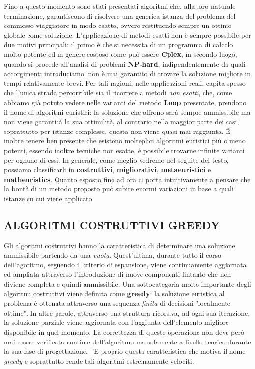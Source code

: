 \documentclass[11pt]{article}
\begin{document}
Fino a questo momento sono stati presentati algoritmi che, alla loro naturale terminazione, garantiscono di risolvere una generica istanza del problema del commesso viaggiatore in modo esatto, ovvero restituendo sempre un ottimo globale come soluzione.
L'applicazione di metodi esatti non è sempre possibile per due motivi principali: il primo è che si necessita di un programma di calcolo molto potente ed in genere costoso come può essere \textbf{Cplex}, in secondo luogo, quando si procede all'analisi di problemi \textbf{NP-hard}, indipendentemente da quali accorgimenti introduciamo, non è mai garantito di trovare la soluzione migliore in tempi relativamente brevi.
Per tali ragioni, nelle applicazioni reali, capita spesso che l'unica strada percorribile sia il ricorrere a metodi \textit{non esatti}, che, come abbiamo già potuto vedere nelle varianti del metodo \textbf{Loop} presentate, prendono il nome di algoritmi euristici: la soluzione che offrono sarà sempre ammissibile ma non viene garantità la sua ottimilità, al contrario nella maggior parte dei casi, soprattutto per istanze complesse, questa non viene quasi mai raggiunta. \'E inoltre tenere ben presente che esistono molteplici algoritmi euristici più o meno potenti, essendo inoltre tecniche non esatte, è possibile trovarne infinite varianti per ognuno di essi. In generale, come meglio vedremo nel seguito del testo, possiamo classificarli in \textbf{costruttivi}, \textbf{migliorativi}, \textbf{metaeuristici} e \textbf{matheuristics}.
Quanto esposto fino ad ora ci porta intuitivamente a pensare che la bontà di un metodo proposto può subire enormi variazioni in base a quali istanze su cui viene applicato.

\subsection*{ALGORITMI COSTRUTTIVI GREEDY}
\label{sec:GreedyS}

Gli algoritmi costruttivi hanno la caratteristica di determinare una soluzione ammissibile partendo da una \textit{vuota}. Quest'ultima, durante tutto il corso dell'agoritmo, seguendo il criterio di espansione, viene continuamente aggiornata ed ampliata attraverso l'introduzione di nuove componenti fintanto che non diviene completa e quindi ammissibile.
Una sottocategoria molto importante degli algoritmi costruttivi viene definita come \textbf{greedy}: la soluzione euristica al problema è ottenuta attraverso una sequenza \textit{finita} di decisioni "localmente ottime". In altre parole, attraverso una struttura ricorsiva, ad ogni sua iterazione, la soluzione parziale viene aggiornata con l'aggiunta dell'elemento migliore disponibile in quel momento. La correttezza di queste operazione non deve però mai essere verificata runtime dell'algoritmo ma solamente a livello teorico durante la sua fase di progettazione. |'E proprio questa caratteristica che motiva il nome \textit{greedy} e soprattutto rende tali algoritmi estremamente velociti.
\end{document}
